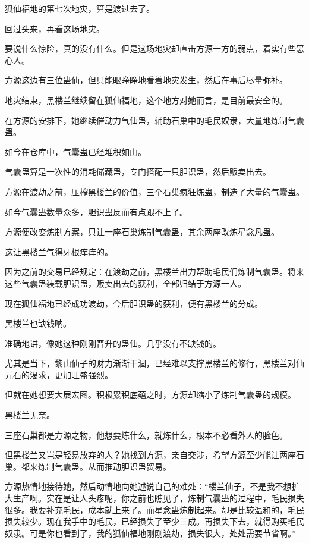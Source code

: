 
\begin{this_body}

狐仙福地的第七次地灾，算是渡过去了。

回过头来，再看这场地灾。

要说什么惊险，真的没有什么。但是这场地灾却直击方源一方的弱点，着实有些恶心人。

方源这边有三位蛊仙，但只能眼睁睁地看着地灾发生，然后在事后尽量弥补。

地灾结束，黑楼兰继续留在狐仙福地，这个地方对她而言，是目前最安全的。

在方源的安排下，她继续催动力气仙蛊，辅助石巢中的毛民奴隶，大量地炼制气囊蛊。

如今在仓库中，气囊蛊已经堆积如山。

气囊蛊算是一次性的消耗储藏蛊，专门搭配一只胆识蛊，然后贩卖出去。

方源在渡劫之前，压榨黑楼兰的价值，三个石巢疯狂炼蛊，制造了大量的气囊蛊。

如今气囊蛊数量众多，胆识蛊反而有点跟不上了。

方源便改变炼制方案，只让一座石巢炼制气囊蛊，其余两座改炼星念凡蛊。

这让黑楼兰气得牙根痒痒的。

因为之前的交易已经规定：在渡劫之前，黑楼兰出力帮助毛民们炼制气囊蛊。将来这些气囊蛊装载胆识蛊，贩卖出去的获利，全部归结于方源一人。

现在狐仙福地已经成功渡劫，今后胆识蛊的获利，便有黑楼兰的分成。

黑楼兰也缺钱呐。

准确地讲，像她这种刚刚晋升的蛊仙。几乎没有不缺钱的。

尤其是当下，黎山仙子的财力渐渐干涸，已经难以支撑黑楼兰的修行，黑楼兰对仙元石的渴求，更加旺盛强烈。

但就在她想要大展宏图。积极累积底蕴之时，方源却缩小了炼制气囊蛊的规模。

黑楼兰无奈。

三座石巢都是方源之物，他想要炼什么，就炼什么，根本不必看外人的脸色。

但黑楼兰又岂是轻易放弃的人？她找到方源，亲自交涉，希望方源至少能让两座石巢。都来炼制气囊蛊。从而推动胆识蛊贸易。

方源热情地接待她，然后动情地向她述说自己的难处：“楼兰仙子，不是我不想扩大生产啊。实在是让人头疼呢，你之前也瞧见了，炼制气囊蛊的过程中，毛民损失很多。我要补充毛民，成本就上来了。而星念蛊炼制起来。却是比较温和的，毛民损失较少。现在我手中的毛民，已经损失了至少三成。再损失下去，就得购买毛民奴隶。可是你也看到了，我的狐仙福地刚刚渡劫，损失很大，处处需要节省啊。”


\end{this_body}
